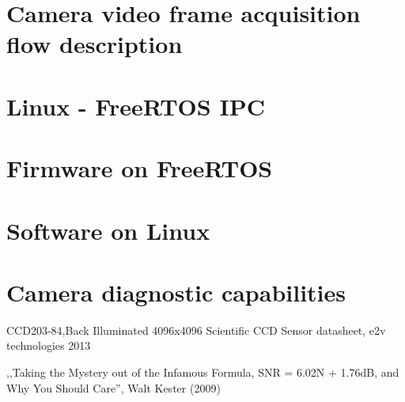 \documentclass[10pt,a4paper]{report}
\begin{document}


\section{Camera video frame acquisition flow description}



\section{Linux - FreeRTOS IPC}
\label{chap:ipc}



\section{Firmware on FreeRTOS}



\section{Software on Linux}



\section{Camera diagnostic capabilities}
\label{chap:diag}



\begin{thebibliography}{1}

 CCD203-84,Back Illuminated 4096x4096 Scientific CCD Sensor datasheet, e2v technologies 2013

 ,,Taking the Mystery out of the Infamous Formula,
SNR = 6.02N + 1.76dB, and Why You Should Care'', Walt Kester (2009)
\end{thebibliography}

\begin{appendix}



\end{appendix}
\end{document}
